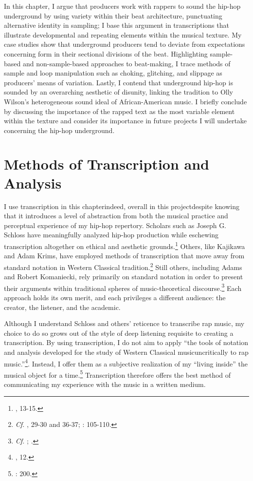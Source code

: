 In this chapter, I argue that producers work with rappers to sound the hip-hop underground by using variety within their beat architecture, punctuating alternative identity in sampling; I base this argument in transcriptions that illustrate developmental and repeating elements within the musical texture. My case studies show that underground producers tend to deviate from expectations concerning form in their sectional divisions of the beat. Highlighting sample-based and non-sample-based approaches to beat-making, I trace methods of sample and loop manipulation such as choking, glitching, and slippage as producers' means of variation. Lastly, I contend that underground hip-hop is sounded by an overarching aesthetic of disunity, linking the tradition to Olly Wilson's heterogeneous sound ideal of African-American music. I briefly conclude by discussing the importance of the rapped text as the most variable element within the texture and consider its importance in future projects I will undertake concerning the hip-hop underground.

\section{Methods of Transcription and Analysis}
I use transcription in this chapter\textemdash indeed, overall in this project\textemdash despite knowing that it introduces a level of abstraction from both the musical practice and perceptual experience of my hip-hop repertory. Scholars such as Joseph G. Schloss have meaningfully analyzed hip-hop production while eschewing transcription altogether on ethical and aesthetic grounds.\footnote{\cite{josephgschlossMakingBeatsArt2004}, 13-15.} Others, like Kajikawa and Adam Krims, have employed methods of transcription that move away from standard notation in Western Classical tradition.\footnote{\textit{Cf.} \cite{lorenkajikawaSoundingRaceRap2015}, 29-30 and 36-37; \cite{adamkrimsRapMusicPoetics2000}: 105-110.} Still others, including Adams and Robert Komaniecki, rely primarily on standard notation in order to present their arguments within traditional spheres of music-theoretical discourse.\footnote{\textit{Cf. }\cite{kyleadamsMetricalTechniquesFlow2009}; \cite{robertkomanieckiAnalyzingCollaborativeFlow2017}.} Each approach holds its own merit, and each privileges a different audience: the creator, the listener, and the academic.

Although I understand Schloss and others' reticence to transcribe rap music, my choice to do so grows out of the style of deep listening requisite to creating a transcription. By using transcription, I do not aim to apply ``the tools of notation and analysis developed for the study of Western Classical music\textellipsis uncritically to rap music.''\footnote{\cite{lorenkajikawaSoundingRaceRap2015}, 12.}. Instead, I offer them as a subjective realization of my ``living inside'' the musical object for a time.\footnote{\cite{peterwinklerWritingGhostNotes1997}: 200.} Transcription therefore offers the best method of communicating my experience with the music in a written medium.


